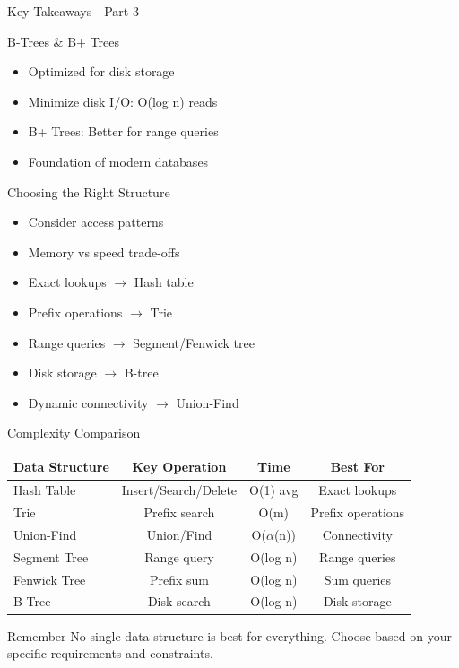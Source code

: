 \documentclass[aspectratio=169,xcolor=dvipsnames]{beamer}
\begin{document}
\begin{frame}{Key Takeaways - Part 3}
  \begin{block}{B-Trees \& B+ Trees}
    \begin{itemize}
      \item Optimized for disk storage
      \item Minimize disk I/O: O(log n) reads
      \item B+ Trees: Better for range queries
      \item Foundation of modern databases
    \end{itemize}
  \end{block}

  \vspace{0.3cm}

  \begin{alertblock}{Choosing the Right Structure}
    \begin{itemize}
      \item Consider access patterns
      \item Memory vs speed trade-offs
      \item Exact lookups $\to$ Hash table
      \item Prefix operations $\to$ Trie
      \item Range queries $\to$ Segment/Fenwick tree
      \item Disk storage $\to$ B-tree
      \item Dynamic connectivity $\to$ Union-Find
    \end{itemize}
  \end{alertblock}
\end{frame}

\begin{frame}{Complexity Comparison}
  \begin{table}
    \centering
    \footnotesize
    \begin{tabular}{l|c|c|c}
      \toprule
      \textbf{Data Structure} & \textbf{Key Operation} & \textbf{Time} & \textbf{Best For} \\
      \midrule
      Hash Table & Insert/Search/Delete & O(1) avg & Exact lookups \\
      Trie & Prefix search & O(m) & Prefix operations \\
      Union-Find & Union/Find & O($\alpha$(n)) & Connectivity \\
      Segment Tree & Range query & O(log n) & Range queries \\
      Fenwick Tree & Prefix sum & O(log n) & Sum queries \\
      B-Tree & Disk search & O(log n) & Disk storage \\
      \bottomrule
    \end{tabular}
  \end{table}

  \vspace{0.3cm}

  \begin{exampleblock}{Remember}
    No single data structure is best for everything. Choose based on your specific requirements and constraints.
  \end{exampleblock}
\end{frame}
\end{document}
